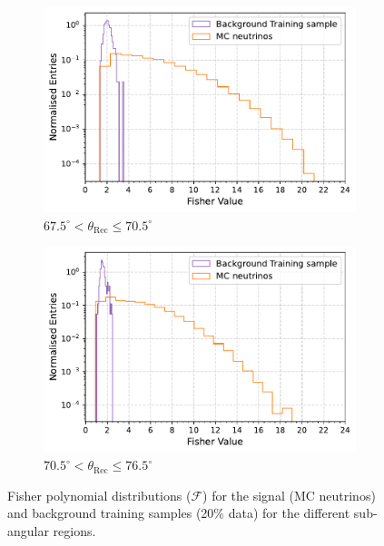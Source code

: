 \begin{figure}[h!]
    \begin{subfigure}[r]{.48\textwidth}
      \centering
      \includegraphics[width=\linewidth]{thesis_figures/Nu_analysis/Fisher_plots/Fisher_nu_bkg_region_67.5_70.5.pdf}
      \caption{$ 67.5^{\circ} <\theta_{\text{Rec}} \leq 70.5^{\circ}$}
    \end{subfigure}
    \hfill    
    \begin{subfigure}[r]{.48\textwidth}
      \centering
      \includegraphics[width=\linewidth]{thesis_figures/Nu_analysis/Fisher_plots/Fisher_nu_bkg_region_70.5_73.5.pdf}
      \caption{$ 70.5^{\circ} <\theta_{\text{Rec}} \leq 76.5^{\circ}$}
   \end{subfigure}
   \caption{Fisher polynomial distributions ($\mathcal{F}$) for the signal (MC neutrinos) and background training samples (20\% data) for the different sub-angular regions.}
    \label{fig:Fisher_dists}

\end{figure}

